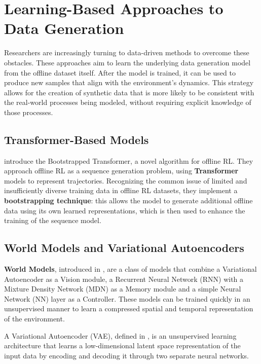 \section{Learning-Based Approaches to Data Generation}

Researchers are increasingly turning to data-driven methods
to overcome these obstacles. These approaches aim to learn
the underlying data generation model from the offline
dataset itself. After the model is trained,
it can be used to produce new samples that align
with the environment's dynamics. This strategy allows
for the creation of synthetic data that is more likely
to be consistent with the real-world processes
being modeled, without requiring explicit knowledge
of those processes.

\subsection{Transformer-Based Models}

\cite{wang2022} introduce the Bootstrapped Transformer,
a novel algorithm for offline RL.
They approach offline RL as a sequence generation
problem, using \textbf{Transformer} models to represent
trajectories. Recognizing the common issue of
limited and insufficiently diverse training
data in offline RL datasets, they implement a
\textbf{bootstrapping technique}: 
this allows the model to generate additional
offline data using its own learned representations,
which is then used to enhance the training of
the sequence model.

\subsection{World Models and Variational Autoencoders}

\textbf{World Models}, introduced in \cite{ha2018},
are a class of models that combine a Variational
Autoencoder as a Vision module,
a Recurrent Neural Network (RNN)
with a Mixture Density Network (MDN) as a Memory
module and a simple Neural Network (NN)
layer as a Controller.
These models can be trained
quickly in an unsupervised manner to learn a
compressed spatial and temporal representation
of the environment.

A Variational Autoencoder (VAE),
defined in \cite{kingma2013},
is an unsupervised learning architecture
that learns a low-dimensional latent space
representation of the input data
by encoding and decoding it through
two separate neural networks.
\label{sec:vae}

